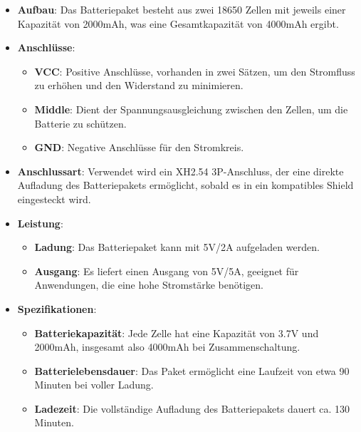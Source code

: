\documentclass{vorlage-design-main}
\begin{document}
\begin{itemize}

\item
  \textbf{Aufbau}: Das Batteriepaket besteht aus zwei 18650 Zellen mit
  jeweils einer Kapazität von 2000mAh, was eine Gesamtkapazität von
  4000mAh ergibt.
\item
  \textbf{Anschlüsse}:

  \begin{itemize}
  
  \item
    \textbf{VCC}: Positive Anschlüsse, vorhanden in zwei Sätzen, um den
    Stromfluss zu erhöhen und den Widerstand zu minimieren.
  \item
    \textbf{Middle}: Dient der Spannungsausgleichung zwischen den
    Zellen, um die Batterie zu schützen.
  \item
    \textbf{GND}: Negative Anschlüsse für den Stromkreis.
  \end{itemize}
\item
  \textbf{Anschlussart}: Verwendet wird ein XH2.54 3P-Anschluss, der
  eine direkte Aufladung des Batteriepakets ermöglicht, sobald es in ein
  kompatibles Shield eingesteckt wird.
\item
  \textbf{Leistung}:

  \begin{itemize}
  
  \item
    \textbf{Ladung}: Das Batteriepaket kann mit 5V/2A aufgeladen werden.
  \item
    \textbf{Ausgang}: Es liefert einen Ausgang von 5V/5A, geeignet für
    Anwendungen, die eine hohe Stromstärke benötigen.
  \end{itemize}
\item
  \textbf{Spezifikationen}:

  \begin{itemize}
  
  \item
    \textbf{Batteriekapazität}: Jede Zelle hat eine Kapazität von 3.7V
    und 2000mAh, insgesamt also 4000mAh bei Zusammenschaltung.
  \item
    \textbf{Batterielebensdauer}: Das Paket ermöglicht eine Laufzeit von
    etwa 90 Minuten bei voller Ladung.
  \item
    \textbf{Ladezeit}: Die vollständige Aufladung des Batteriepakets
    dauert ca. 130 Minuten.
  \end{itemize}
\end{itemize}
\end{document}
